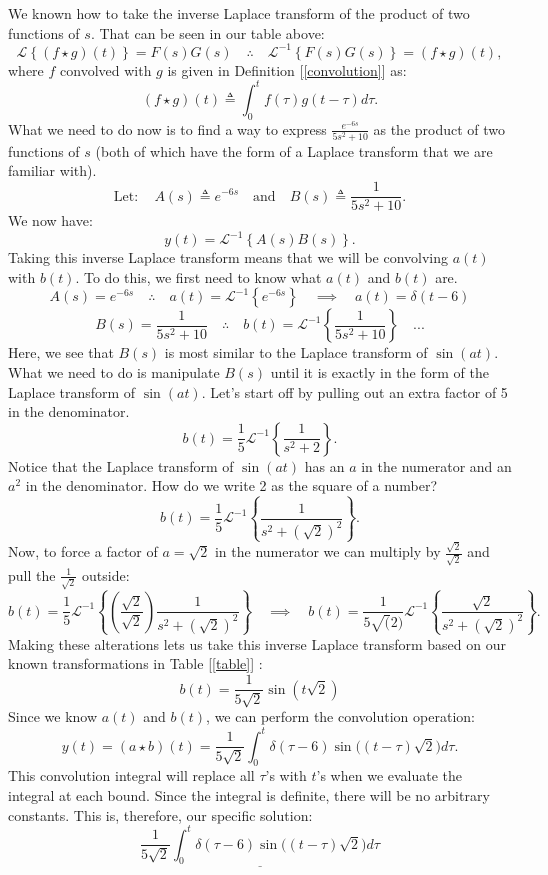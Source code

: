 \documentclass[a4paper,12pt]{article} %
\begin{document}
We known how to take the inverse Laplace transform of the product of two functions of $s$. That can be seen in our table above:
$$ \mathcal{L}\left\{(f\star g)(t)\right\} = F(s)G(s) \quad\therefore\quad \mathcal{L}^{-1}\left\{F(s)G(s)\right\} = (f\star g)(t), $$
where $f$ convolved with $g$ is given in Definition [\ref{convolution}] as:
$$ (f\star g)(t) \triangleq \int_{0}^{t}f(\tau)g(t-\tau)d\tau.  $$
What we need to do now is to find a way to express $\frac{e^{-6s}}{5s^2 + 10}$ as the product of two functions of $s$ (both of which have the form of a Laplace transform that we are familiar with).
$$ \text{Let}: \quad A(s) \triangleq e^{-6s} \quad\text{and} \quad B(s)\triangleq\frac{1}{5s^2 + 10}. $$
We now have:
$$ y(t) = \mathcal{L}^{-1}\left\{A(s)B(s)\right\}. $$
Taking this inverse Laplace transform means that we will be convolving $a(t)$ with $b(t)$. To do this, we first need to know what $a(t)$ and $b(t)$ are.
$$ A(s) = e^{-6s} \quad\therefore\quad a(t) = \mathcal{L}^{-1}\left\{e^{-6s}\right\} \quad\implies\quad \boxed{a(t) = \delta(t-6)} $$
$$ B(s) = \frac{1}{5s^2 + 10} \quad\therefore\quad b(t) = \mathcal{L}^{-1}\left\{\frac{1}{5s^2 + 10}\right\} \quad... $$
Here, we see that $B(s)$ is most similar to the Laplace transform of $\sin{(at)}$. What we need to do is manipulate $B(s)$ until it is exactly in the form of the Laplace transform of $\sin{(at)}$. Let's start off by pulling out an extra factor of 5 in the denominator.
$$ b(t) = \frac{1}{5}\mathcal{L}^{-1}\left\{\frac{1}{s^2 + 2}\right\}. $$
Notice that the Laplace transform of $\sin{(at)}$ has an $a$ in the numerator and an $a^2$ in the denominator. How do we write 2 as the square of a number?
$$ b(t) = \frac{1}{5}\mathcal{L}^{-1}\left\{\frac{1}{s^2 + (\sqrt{2})^2}\right\}.  $$
Now, to force a factor of $a=\sqrt{2}$ in the numerator we can multiply by $\frac{\sqrt{2}}{\sqrt{2}}$ and pull the $\frac{1}{\sqrt{2}}$ outside:
$$ b(t) = \frac{1}{5}\mathcal{L}^{-1}\left\{\left(\frac{\sqrt{2}}{\sqrt{2}}\right)\frac{1}{s^2 + (\sqrt{2})^2}\right\} \quad\implies\quad b(t) = \frac{1}{5\sqrt(2)}\mathcal{L}^{-1}\left\{\frac{\sqrt2}{s^2 + (\sqrt2)^2}\right\}.$$
Making these alterations lets us take this inverse Laplace transform based on our known transformations in Table [\ref{table}] :
$$ \boxed{b(t) = \frac{1}{5\sqrt{2}}\sin{(t\sqrt{2})}} $$
Since we know $a(t)$ and $b(t)$, we can perform the convolution operation:
$$ y(t) = (a\star b)(t) = \frac{1}{5\sqrt{2}}\int_{0}^{t} \delta(\tau-6)\sin{\big((t-\tau)\sqrt{2}\big)}d\tau. $$
This convolution integral will replace all $\tau$'s with $t$'s when we evaluate the integral at each bound. Since the integral is definite, there will be no arbitrary constants. This is, therefore, our specific solution:
$$ \underline{\boxed{\frac{1}{5\sqrt{2}}\int_{0}^{t} \delta(\tau-6)\sin{\big((t-\tau)\sqrt{2}\big)}d\tau}} $$
\end{document}
